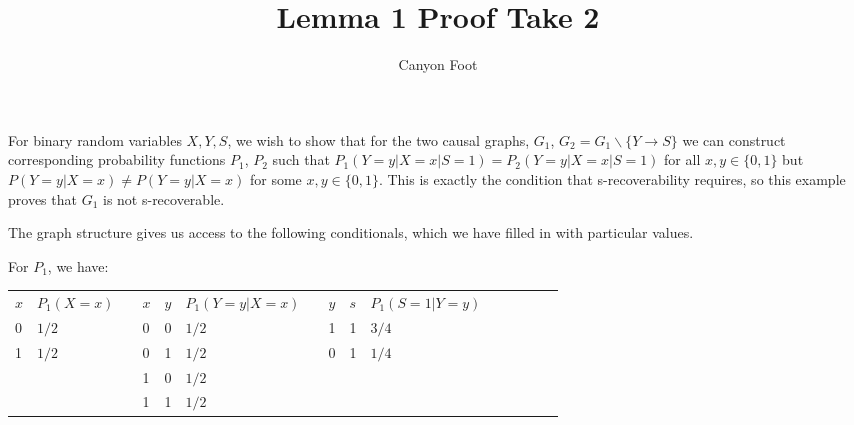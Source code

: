 \documentclass[12pt]{article}
\title{\vspace{-3cm} Lemma 1 Proof Take 2}
\author{Canyon Foot}
\begin{document}
\maketitle

For binary random variables $X,Y,S$, we wish to show that for the two causal graphs, $G_1$, $G_2 = G_1 \backslash \{Y \rightarrow S\}$ we can construct corresponding probability functions $P_1$, $P_2$ such that $P_1(Y = y | X = x | S = 1) = P_2(Y = y | X = x | S = 1)$ for all $x, y \in \{0, 1\}$ but $P(Y = y | X = x) \neq P(Y = y | X = x)$ for some $x,y \in \{0,1\}$. This is exactly the condition that s-recoverability requires, so this example proves that $G_1$ is not s-recoverable.



The graph structure gives us access to the following conditionals, which we have filled in with particular values.

For $P_1$, we have: \\

\begin{tabular}{llll|l|llllllllll}
\multicolumn{1}{l|}{$x$} & $P_1(X = x)$ &  & $x$ & $y$ & $P_1(Y = y | X = x)$ &  & \multicolumn{1}{l|}{$y$} & \multicolumn{1}{l|}{$s$} & $P_1(S = 1 | Y = y)$ &  &  &  &  &  \\ \cline{1-2} \cline{4-6} \cline{8-10}
\multicolumn{1}{l|}{0}   & $1/2$        &  & 0   & 0   & $1/2$                &  & \multicolumn{1}{l|}{1}   & \multicolumn{1}{l|}{1}   & $3/4$                &  &  &  &  &  \\
\multicolumn{1}{l|}{1}   & $1/2$        &  & 0   & 1   & $1/2$                &  & \multicolumn{1}{l|}{0}   & \multicolumn{1}{l|}{1}   & $1/4$                &  &  &  &  &  \\
                         &              &  & 1   & 0   & $1/2$                &  &                          &                          &                      &  &  &  &  &  \\
                         &              &  & 1   & 1   & $1/2$                &  &                          &                          &                      &  &  &  &  & 
\end{tabular}
\end{document}

